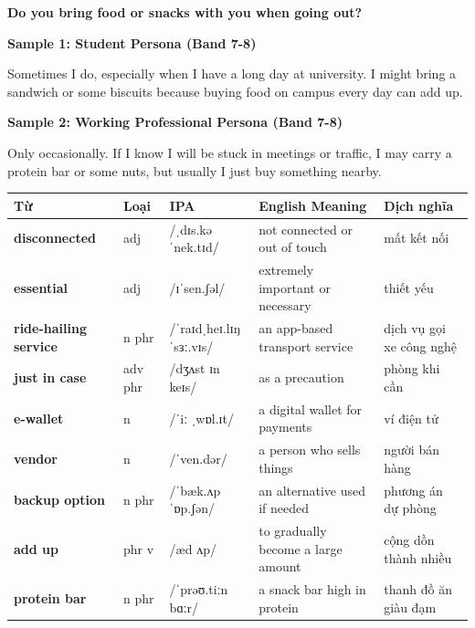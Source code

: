 \begin{ieltsquestion}
\textbf{Do you bring food or snacks with you when going out?}
\end{ieltsquestion}
\textbf{Sample 1: Student Persona (Band 7-8)}

Sometimes I do, especially when I have a long day at university. I might bring a sandwich or some biscuits because buying food on campus every day can add up.

\textbf{Sample 2: Working Professional Persona (Band 7-8)}

Only occasionally. If I know I will be stuck in meetings or traffic, I may carry a protein bar or some nuts, but usually I just buy something nearby.

\separator


\vspace{0.8em}
\begin{center}
\renewcommand{\arraystretch}{1.65}
\begin{tabularx}{\textwidth}{|V{0.22\textwidth}|C{0.07\textwidth}|I{0.20\textwidth}|Y|V{0.18\textwidth}|}
\hline
{}
\textbf{Từ} & \textbf{Loại} & \textbf{IPA} & \textbf{English Meaning} & \textbf{Dịch nghĩa} \\
\hline
\textbf{disconnected} & adj & /ˌdɪs.kəˈnek.tɪd/ & not connected or out of touch & mất kết nối \\ \hline
\textbf{essential} & adj & /ɪˈsen.ʃəl/ & extremely important or necessary & thiết yếu \\ \hline
\textbf{ride-hailing service} & n phr & /ˈraɪdˌheɪ.lɪŋ ˈsɜː.vɪs/ & an app-based transport service & dịch vụ gọi xe công nghệ \\ \hline
\textbf{just in case} & adv phr & /dʒʌst ɪn keɪs/ & as a precaution & phòng khi cần \\ \hline
\textbf{e-wallet} & n & /ˈiː ˌwɒl.ɪt/ & a digital wallet for payments & ví điện tử \\ \hline
\textbf{vendor} & n & /ˈven.dər/ & a person who sells things & người bán hàng \\ \hline
\textbf{backup option} & n phr & /ˈbæk.ʌp ˈɒp.ʃən/ & an alternative used if needed & phương án dự phòng \\ \hline
\textbf{add up} & phr v & /æd ʌp/ & to gradually become a large amount & cộng dồn thành nhiều \\ \hline
\textbf{protein bar} & n phr & /ˈprəʊ.tiːn bɑːr/ & a snack bar high in protein & thanh đồ ăn giàu đạm \\ \hline
\end{tabularx}
\end{center}

